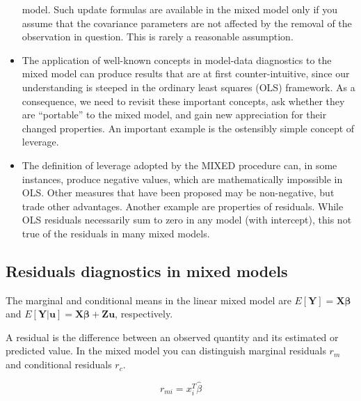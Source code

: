 \documentclass[Main.tex]{subfiles}
\begin{document}
\begin{itemize}
		model. Such update formulas are available in the mixed model only if you assume that the covariance
		parameters are not affected by the removal of the observation in question. This is rarely a reasonable
		assumption.
		\item The application of well-known concepts in model-data diagnostics to the mixed model can produce results
		that are at first counter-intuitive, since our understanding is steeped in the ordinary least squares
		(OLS) framework. As a consequence, we need to revisit these important concepts, ask whether they
		are “portable” to the mixed model, and gain new appreciation for their changed properties. An important
		example is the ostensibly simple concept of leverage. 
		\item The definition of leverage adopted by
		the MIXED procedure can, in some instances, produce negative values, which are mathematically
		impossible in OLS. Other measures that have been proposed may be non-negative, but trade other
		advantages. Another example are properties of residuals. While OLS residuals necessarily sum to
		zero in any model (with intercept), this not true of the residuals in many mixed models.
	\end{itemize}
	\newpage
	
	\subsection{Residuals diagnostics in mixed models}
	
	The marginal and conditional means in the linear mixed model are
	$E[\boldsymbol{Y}] = \boldsymbol{X}\boldsymbol{\beta}$ and
	$E[\boldsymbol{Y|\boldsymbol{u}}] = \boldsymbol{X}\boldsymbol{\beta} + \boldsymbol{Z}\boldsymbol{u}$, respectively.
	
	A residual is the difference between an observed quantity and its estimated or predicted value. In the mixed
	model you can distinguish marginal residuals $r_m$ and conditional residuals $r_c$. 
	
	
	
	
	
	
	
	
	\begin{equation}
	r_{mi}=x^{T}_{i}\hat{\beta}
	\end{equation}
	
	
\end{document}
